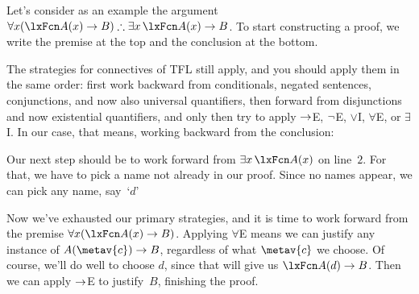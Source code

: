 Let's consider as an example the argument $\forall x(\atom{A}{x} \eif B) \therefore \exists x\,\atom{A}{x} \eif B$. To start constructing a proof, we write the premise at the top and the conclusion at the bottom.
\begin{fitchproof}
\PR
\ellipsesline
{}
\end{fitchproof}
The strategies for connectives of TFL still apply, and you should apply them in the same order: first work backward from conditionals, negated sentences, conjunctions, and now also universal quantifiers, then forward from disjunctions and now existential quantifiers, and only then try to apply $\rightarrow$E, $\neg$E, $\lor$I, $\forall$E, or $\exists$I. In our case, that means, working backward from the conclusion:
\begin{fitchproof}
	\PR
	\open
	\AS
	\ellipsesline
	\close
\end{fitchproof}
Our next step should be to work forward from $\exists x\,\atom{A}{x}$ on line~$2$. For that, we have to pick a name not already in our proof. Since no names appear, we can pick any name, say~`$d$'
\begin{fitchproof}
	\PR
	\open
	\AS
	\open
	\AS
	\ellipsesline
	\close
	\close
\end{fitchproof}
Now we've exhausted our primary strategies, and it is time to work forward from the premise $\forall x(\atom{A}{x} \eif B)$. Applying $\forall$E means we can justify any instance of $A(\metav{c}) \eif B$, regardless of what $\metav{c}$ we choose. Of course, we'll do well to choose $d$, since that will give us $\atom{A}{d} \eif B$. Then we can apply $\rightarrow$E to justify~$B$, finishing the proof.
\begin{fitchproof}
	\PR
	\open
	\AS
	\open
	\AS
{}
	\close
	\close
\end{fitchproof}

